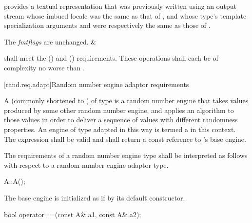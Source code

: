 \begin{libreqtab4d}
    \requires
     provides a textual representation
    that was previously written
    using an output stream
    whose imbued locale
    was the same as that of ,
    and whose type's template specialization arguments
     and 
    were respectively the same as those of .

    \ensures The \textit{fmtflags} are unchanged.
  & 
  \\
\end{libreqtab4d}

\pnum
{} shall meet the
 ()
and  () requirements.
These operations shall each be of complexity
no worse than .


%



[rand.req.adapt]{Random number engine adaptor requirements}%

\pnum
A 
(commonly shortened to )
 of type 
is a random number engine
that takes values
produced by some other random number engine,
and applies an algorithm to those values
in order to deliver a sequence of values
with different randomness properties.
An engine  of type  adapted in this way
is termed a 
in this context.
The expression  shall be valid and shall return a
const reference to 's base engine.

\pnum
The requirements of a random number engine type
shall be interpreted as follows
with respect to a random number engine adaptor type.

\begin{itemdecl}
A::A();
\end{itemdecl}

\begin{itemdescr}
\pnum\effects
 The base engine is initialized
 as if by its default constructor.
\end{itemdescr}

\begin{itemdecl}
bool operator==(const A& a1, const A& a2);
\end{itemdecl}

